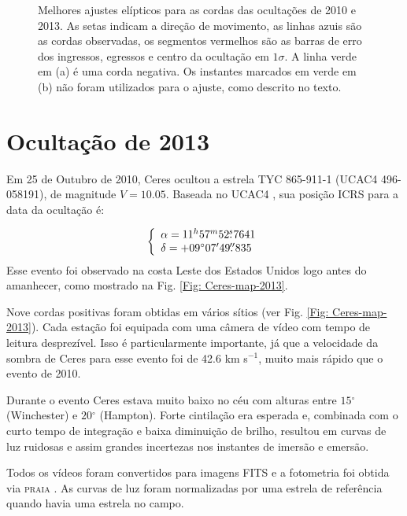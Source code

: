 \documentclass[12pt,a4paper]{monografia}
\newcommand{\degr}{\ensuremath{^{\circ}}}%
\newcommand{\arcmin}{\ensuremath{^{\prime}}}%
\newcommand{\fs}{\mbox{\ensuremath{.\!\!^s}}}
\newcommand{\farcs}{\mbox{\ensuremath{.\!\!^{\prime\prime}}}}%
\begin{document}
\begin{figure}[h]
\begin{centering}
\caption{Melhores ajustes elípticos para as cordas das ocultações de 2010 e 2013. As setas indicam a direção de movimento, as linhas azuis são as cordas observadas, os segmentos vermelhos são as barras de erro dos ingressos, egressos e centro da ocultação em $1\sigma$. A linha verde em (a) é uma corda negativa. Os instantes marcados em verde em (b) não foram utilizados para o ajuste, como descrito no texto.
\label{Fig: Ceres-limb}}
\end{centering}
\end{figure}


\section{Ocultação de 2013}
\label{Subsec: 2013-occ}

\indent \indent Em 25 de Outubro de 2010, Ceres ocultou a estrela TYC 865-911-1 (UCAC4 496-058191), de magnitude $V = 10.05$. Baseada no UCAC4 \citep{Zacharias2013}, sua posição ICRS para a data da ocultação é:

%
\begin{equation}
\left\{ 
  \begin{array}{l l}
    \alpha = 11^{h}57^{m}52\fs7641\\
    \delta = +09\degr 07\arcmin 49\farcs835
  \end{array}
\right.
\end{equation}
%
Esse evento foi observado na costa Leste dos Estados Unidos logo antes do amanhecer, como mostrado na Fig. \ref{Fig: Ceres-map-2013}.

Nove cordas positivas foram obtidas em vários sítios (ver Fig. \ref{Fig: Ceres-map-2013}). Cada estação foi equipada com uma câmera de vídeo com tempo de leitura desprezível. Isso é particularmente importante, já que a velocidade da sombra de Ceres para esse evento foi de 42.6 km s$^{-1}$, muito mais rápido que o evento de 2010.

Durante o evento Ceres estava muito baixo no céu com alturas entre $15\degr$ (Winchester) e $20\degr$ (Hampton). Forte cintilação era esperada e, combinada com o curto tempo de integração e baixa diminuição de brilho, resultou em curvas de luz ruidosas e assim grandes incertezas nos instantes de imersão e emersão.

Todos os vídeos foram convertidos para imagens FITS e a fotometria foi obtida via \textsc{praia} \cite{Assafin2011}. As curvas de luz foram normalizadas por uma estrela de referência quando havia uma estrela no campo.
\end{document}
